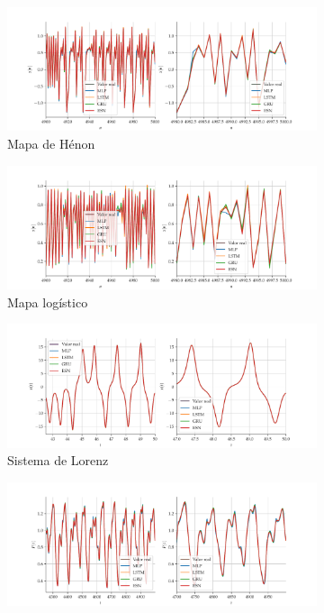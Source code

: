 \documentclass{article}
\begin{document}
\begin{figure}[!ht]
     \begin{subfigure}[t]{0.24\textwidth}
         \includegraphics[scale=0.15]{vs-henon-merged.pdf}
         \caption{Mapa de Hénon}
     \end{subfigure}
     \centering
     \begin{subfigure}[t]{0.24\textwidth} 
         \includegraphics[scale=0.15]{vs-logistic-merged.pdf}
         \caption{Mapa logístico}
     \end{subfigure}
     \centering
     \begin{subfigure}[t]{0.24\textwidth}
         \includegraphics[scale=0.15]{vs-lorenz-merged.pdf}
         \caption{Sistema de Lorenz}
     \end{subfigure}
     \centering
     \begin{subfigure}[t]{0.24\textwidth}
         \includegraphics[scale=0.15]{vs-mackeyglass-merged.pdf}

\end{subfigure}
\end{figure}
\end{document}

